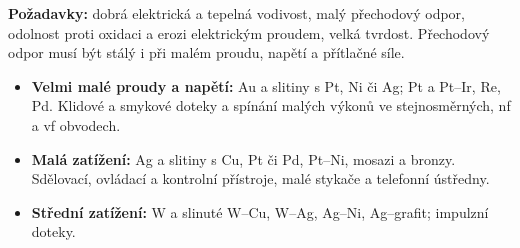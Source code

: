 \textbf{Požadavky:} dobrá elektrická a tepelná vodivost, malý přechodový odpor, odolnost proti oxidaci a erozi elektrickým proudem, velká tvrdost. Přechodový odpor musí být stálý i při malém proudu, napětí a přítlačné síle.
\begin{itemize}
\item \textbf{Velmi malé proudy a napětí:} Au a slitiny s Pt, Ni či Ag; Pt a Pt--Ir, Re, Pd. Klidové a smykové doteky a spínání malých výkonů ve stejnosměrných, nf a vf obvodech.
\item \textbf{Malá zatížení:} Ag a slitiny s Cu, Pt či Pd, Pt--Ni, mosazi a bronzy. Sdělovací, ovládací a kontrolní přístroje, malé stykače a telefonní ústředny.
\item \textbf{Střední zatížení:} W a slinuté W--Cu, W--Ag, Ag--Ni, Ag--grafit; impulzní doteky.
\end{itemize}
